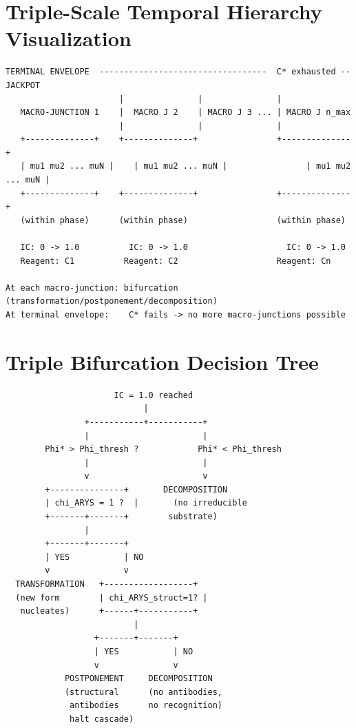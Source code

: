\documentclass[12pt,a4paper]{article}
\begin{document}
\section{Triple-Scale Temporal Hierarchy Visualization}\label{app:hierarchy}

\begin{verbatim}
TERMINAL ENVELOPE  ----------------------------------  C* exhausted -- JACKPOT
                       |               |               |
   MACRO-JUNCTION 1    |  MACRO J 2    | MACRO J 3 ... | MACRO J n_max
                       |               |               |
   +--------------+    +--------------+                +--------------+
   | mu1 mu2 ... muN |    | mu1 mu2 ... muN |                | mu1 mu2 ... muN |
   +--------------+    +--------------+                +--------------+
   (within phase)      (within phase)                  (within phase)

   IC: 0 -> 1.0          IC: 0 -> 1.0                    IC: 0 -> 1.0
   Reagent: C1          Reagent: C2                    Reagent: Cn

At each macro-junction: bifurcation (transformation/postponement/decomposition)
At terminal envelope:    C* fails -> no more macro-junctions possible
\end{verbatim}

\section{Triple Bifurcation Decision Tree}\label{app:bif_tree}

\begin{verbatim}
                      IC = 1.0 reached
                            |
                +-----------+-----------+
                |                       |
        Phi* > Phi_thresh ?            Phi* < Phi_thresh
                |                       |
                v                       v
        +---------------+       DECOMPOSITION
        | chi_ARYS = 1 ?  |       (no irreducible
        +-------+-------+        substrate)
                |
        +-------+-------+
        | YES           | NO
        v               v
  TRANSFORMATION   +------------------+
  (new form        | chi_ARYS_struct=1? |
   nucleates)      +------+-----------+
                          |
                  +-------+-------+
                  | YES           | NO
                  v               v
            POSTPONEMENT     DECOMPOSITION
            (structural      (no antibodies,
             antibodies      no recognition)
             halt cascade)
\end{verbatim}
\end{document}
